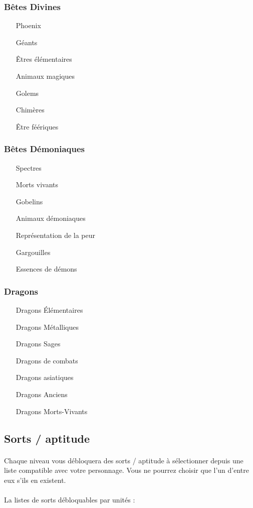 \subsubsection{Bêtes Divines} 

\begin{itemize}
	\item[Phoenix]
	\item[Géants]
	\item[Êtres élémentaires]
	\item[Animaux magiques]
	\item[Golems]
	\item[Chimères]
	\item[Être féériques]
\end{itemize}

\subsubsection{Bêtes Démoniaques}

\begin{itemize}
	\item[Spectres]
	\item[Morts vivants]
	\item[Gobelins]
	\item[Animaux démoniaques]
	\item[Représentation de la peur]
	\item[Gargouilles]
	\item[Essences de démons]
\end{itemize}

\subsubsection{Dragons}

\begin{itemize}
	\item[Dragons Élémentaires]
	\item[Dragons Métalliques]
	\item[Dragons Sages]
	\item[Dragons de combats]
	\item[Dragons asiatiques]
	\item[Dragons Anciens]
	\item[Dragons Morts-Vivants]
\end{itemize}

\subsection{Sorts / aptitude}

\paragraph{} Chaque niveau vous débloquera des sorts / aptitude à sélectionner depuis une liste compatible avec votre personnage. Vous ne pourrez choisir que l'un d'entre eux s'ils en existent.

\paragraph{} La listes de sorts débloquables par unités :
